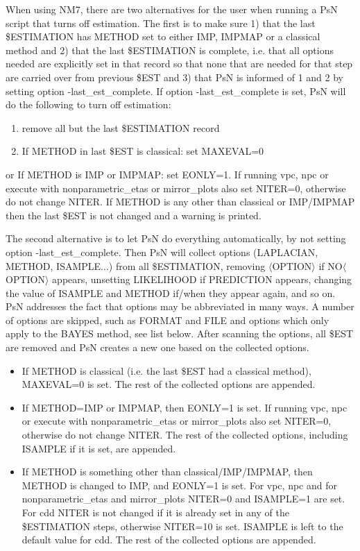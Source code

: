 When using NM7, there are two alternatives for the user when running a PsN script that turns off estimation. The first is to make sure 1) that the last \$ESTIMATION has METHOD set to either IMP, IMPMAP or a classical method and 2) that the last \$ESTIMATION is complete, i.e. that all options needed are explicitly set in that record so that none that are needed for that step are carried over from previous \$EST and 3) that PsN is informed of 1 and 2 by setting option -last\_est\_complete. If option -last\_est\_complete is set, PsN will do the following to turn off estimation: 
\begin{enumerate}
	\item remove all but the last \$ESTIMATION record 
	\item If METHOD in last \$EST is classical: set MAXEVAL=0 
\end{enumerate}
or 
If METHOD is IMP or IMPMAP: set EONLY=1. If running vpc, npc or execute with nonparametric\_etas or mirror\_plots also set NITER=0, otherwise do not change NITER.
If METHOD is any other than classical or IMP/IMPMAP then the last \$EST is not changed and a warning is printed.

The second alternative is to let PsN do everything automatically, by not setting option -last\_est\_complete. Then PsN will collect options (LAPLACIAN, METHOD, ISAMPLE...) from all \$ESTIMATION, removing $\langle$OPTION$\rangle$ if NO$\langle$OPTION$\rangle$ appears, unsetting LIKELIHOOD if PREDICTION appears, changing the value of ISAMPLE and METHOD if/when they appear again, and so on. PsN addresses the fact that options may be abbreviated in many ways. A number of options are skipped, such as FORMAT and FILE and options which only apply to the BAYES method, see list below. After scanning the options, all \$EST are removed and PsN creates a new one based on the collected options. 

\begin{itemize}
	\item If METHOD is classical (i.e. the last \$EST had a classical method), MAXEVAL=0 is set. The rest of the collected options are appended.
	\item If METHOD=IMP or IMPMAP, then EONLY=1 is set. If running vpc, npc or execute with nonparametric\_etas or mirror\_plots also set NITER=0, otherwise do not change NITER. The rest of the collected options, including ISAMPLE if it is set, are appended. 
	\item If METHOD is something other than classical/IMP/IMPMAP, then METHOD is changed to IMP, and EONLY=1 is set. For vpc, npc and for nonparametric\_etas and mirror\_plots NITER=0 and ISAMPLE=1 are set. For cdd NITER is not changed if it is already set in any of the \$ESTIMATION steps, otherwise NITER=10 is set. ISAMPLE is left to the default value for cdd. The rest of the collected options are appended.
\end{itemize}

